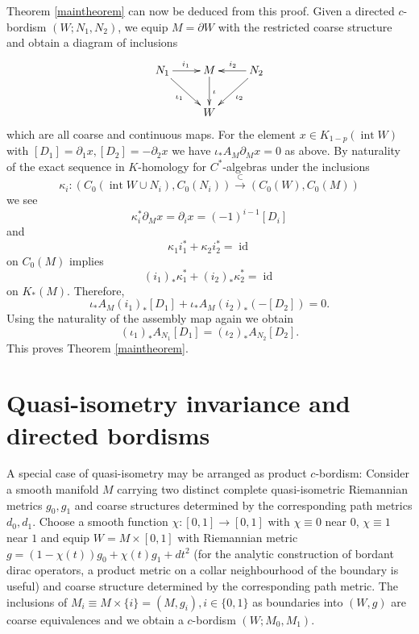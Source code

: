 \documentclass[a4paper]{amsproc}
\theoremstyle{definition}
\theoremstyle{remark}
\numberwithin{equation}{section}
\begin{document}
Theorem \ref{maintheorem} can now be deduced from this proof. Given a directed $c$-bordism $(W;N_1,N_2)$, we equip $M=\partial W$ with the restricted
coarse structure and obtain a diagram of inclusions
\begin{equation*}\xymatrix{N_1\ar[r]^{i_1}\ar[dr]_{\iota_1}
&M\ar[d]^{\iota}
&N_2\ar[l]_{i_2}\ar[dl]^{\iota_2}
\\&W
}\end{equation*}
which are all coarse and continuous maps.
For the element $x\in K_{1-p}(\operatorname{int} W)$ with $[D_1]=\partial_1x, [D_2]=-\partial_2x$ we have $\iota_*A_M\partial_Mx=0$ as above. By naturality of the exact sequence in $K$-homology for $C^*$-algebras under the inclusions 
\begin{equation*}
\kappa_i:(C_0(\operatorname{int} W\cup N_i),C_0(N_i)) \xrightarrow{\subset} (C_0(W),C_0(M))
\end{equation*}
we see
\begin{equation*}
\kappa_i^*\partial_Mx=\partial_ix=(-1)^{i-1} [D_i]
\end{equation*}
and
\begin{equation*}
\kappa_1i_1^*+\kappa_2i_2^*=\operatorname{id}
\end{equation*}
on $C_0(M)$ implies
\begin{equation*}
(i_1)_*\kappa_1^*+(i_2)_*\kappa_2^*=\operatorname{id}
\end{equation*}
on $K_*(M)$. Therefore,
\begin{equation*}
\iota_*A_M(i_1)_*[D_1]+\iota_*A_M(i_2)_*(-[D_2])=0.
\end{equation*}
Using the naturality of the assembly map again we obtain
\begin{equation*}
(\iota_1)_*A_{N_1}[D_1]=(\iota_2)_*A_{N_2}[D_2].
\end{equation*}
This proves Theorem \ref{maintheorem}.

\section{Quasi-isometry invariance and directed
bordisms}\label{application}
A special case of quasi-isometry may be arranged as product $c$-bordism: Consider a smooth manifold $M$ carrying two distinct complete
quasi-isometric Riemannian metrics $g_0,g_1$ and coarse structures determined by the corresponding path metrics $d_0,d_1$. Choose a smooth function $\chi:[0,1]\to [0,1]$ with $\chi\equiv 0$ near $0$, $\chi\equiv 1$ near $1$ and equip $W=M\times [0,1]$ with Riemannian metric
$g=(1-\chi(t))g_0+\chi(t)g_1+dt^2$ (for the analytic construction of bordant dirac operators, a product metric on a collar neighbourhood of the boundary is useful) and coarse structure determined by the corresponding path metric. The inclusions of $M_i\equiv M\times
\{i\}=(M,g_i), i\in\{0,1\}$ as boundaries into $(W,g)$ are coarse
equivalences and we obtain a $c$-bordism $(W;M_0,M_1)$.
\end{document}
